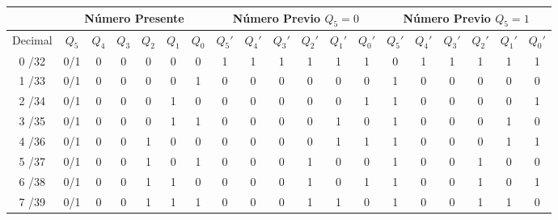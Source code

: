 \begin{table}[H]
  \centering
  \begin{adjustbox}{max width=\textwidth}
    \begin{tabular}{ c | c | c | c | c | c | c ||| c | c | c | c | c | c || c | c | c | c | c | c }
       & \multicolumn{6}{c}{\textbf{Número Presente}} &
       \multicolumn{6}{c}{\textbf{Número Previo} \small{$Q_5=0$}} &
       \multicolumn{6}{c}{\textbf{Número Previo} \small{$Q_5=1$}} \\
      \toprule
      Decimal  &
      $Q_5$ & $Q_4$ & $Q_3$ & $Q_2$ & $Q_1$ & $Q_0$ &
      $Q_5\prime$ & $Q_4\prime$ & $Q_3\prime$ & $Q_2\prime$ & $Q_1\prime$ & $Q_0\prime$ &
      $Q_5\prime$ & $Q_4\prime$ & $Q_3\prime$ & $Q_2\prime$ & $Q_1\prime$ & $Q_0\prime$ \\
      \toprule
      0 /32 & 0/1 & 0 & 0 & 0 & 0 & 0 &   1 & 1 & 1 & 1 & 1 & 1 &   0 & 1 & 1 & 1 & 1 & 1 \\
      1 /33 & 0/1 & 0 & 0 & 0 & 0 & 1 &   0 & 0 & 0 & 0 & 0 & 0 &   1 & 0 & 0 & 0 & 0 & 0 \\
      2 /34 & 0/1 & 0 & 0 & 0 & 1 & 0 &   0 & 0 & 0 & 0 & 0 & 1 &   1 & 0 & 0 & 0 & 0 & 1 \\
      3 /35 & 0/1 & 0 & 0 & 0 & 1 & 1 &   0 & 0 & 0 & 0 & 1 & 0 &   1 & 0 & 0 & 0 & 1 & 0 \\ \hline
      4 /36 & 0/1 & 0 & 0 & 1 & 0 & 0 &   0 & 0 & 0 & 0 & 1 & 1 &   1 & 0 & 0 & 0 & 1 & 1 \\
      5 /37 & 0/1 & 0 & 0 & 1 & 0 & 1 &   0 & 0 & 0 & 1 & 0 & 0 &   1 & 0 & 0 & 1 & 0 & 0 \\
      6 /38 & 0/1 & 0 & 0 & 1 & 1 & 0 &   0 & 0 & 0 & 1 & 0 & 1 &   1 & 0 & 0 & 1 & 0 & 1 \\
      7 /39 & 0/1 & 0 & 0 & 1 & 1 & 1 &   0 & 0 & 0 & 1 & 1 & 0 &   1 & 0 & 0 & 1 & 1 & 0 \\ \hline

\end{tabular}
\end{adjustbox}
\end{table}
